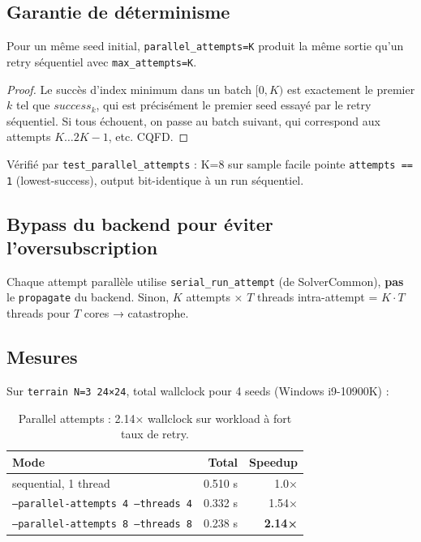 \subsection{Garantie de déterminisme}

\begin{theorem}
Pour un même seed initial, \texttt{parallel\_attempts=K} produit la même sortie qu'un retry séquentiel avec \texttt{max\_attempts=K}.
\end{theorem}

\begin{proof}
Le succès d'index minimum dans un batch $[0, K)$ est exactement le premier $k$ tel que $success_k$, qui est précisément le premier seed essayé par le retry séquentiel. Si tous échouent, on passe au batch suivant, qui correspond aux attempts $K \ldots 2K-1$, etc. CQFD.
\end{proof}

Vérifié par \texttt{test\_parallel\_attempts} : K=8 sur sample facile pointe \texttt{attempts == 1} (lowest-success), output bit-identique à un run séquentiel.

\subsection{Bypass du backend pour éviter l'oversubscription}

Chaque attempt parallèle utilise \texttt{serial\_run\_attempt} (de SolverCommon), \textbf{pas} le \texttt{propagate} du backend. Sinon, $K$ attempts × $T$ threads intra-attempt = $K \cdot T$ threads pour $T$ cores → catastrophe.

\subsection{Mesures}

Sur \texttt{terrain N=3 24×24}, total wallclock pour 4 seeds (Windows i9-10900K) :

\begin{table}[H]
\centering
\begin{tabular}{lrr}
\toprule
\textbf{Mode} & \textbf{Total} & \textbf{Speedup} \\
\midrule
sequential, 1 thread & 0.510 s & 1.0× \\
\texttt{--parallel-attempts 4 --threads 4} & 0.332 s & 1.54× \\
\texttt{--parallel-attempts 8 --threads 8} & 0.238 s & \textbf{2.14×} \\
\bottomrule
\end{tabular}
\caption{Parallel attempts : 2.14× wallclock sur workload à fort taux de retry.}
\label{tab:ext:parallel_attempts}
\end{table}

